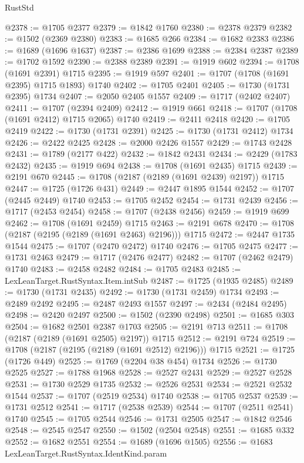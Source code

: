 \begin{lexlean}{RustStd}
\begin{coremodule}
@2378 := @1705 @2377
@2379 := @1842 @1760
@2380 := @2378 @2379
@2382 := @1502 (@2369 @2380)
@2383 := @1685 @266
@2384 := @1682 @2383
@2386 := @1689 (@1696 @1637)
@2387 := @2386 @1699
@2388 := @2384 @2387
@2389 := @1702 @1592
@2390 := @2388 @2389
@2391 := @1919 @602
@2394 := @1708 (@1691 @2391) @1715
@2395 := @1919 @597
@2401 := @1707 (@1708 (@1691 @2395) @1715 @1893) @1740
@2402 := @1705 @2401
@2405 := @1730 (@1731 @2395) @1734
@2407 := @2050 @2405 @1557
@2409 := @1717 (@2402 @2407)
@2411 := @1707 (@2394 @2409)
@2412 := @1919 @661
@2418 := @1707 (@1708 (@1691 @2412) @1715 @2065) @1740
@2419 := @2411 @2418
@2420 := @1705 @2419
@2422 := @1730 (@1731 @2391)
@2425 := @1730 (@1731 @2412) @1734
@2426 := @2422 @2425
@2428 := @2000 @2426 @1557
@2429 := @1743 @2428
@2431 := @1789 (@2177 @422)
@2432 := @1842 @2431
@2434 := @2429 (@1783 @2432)
@2435 := @1919 @694
@2438 := @1708 (@1691 @2435) @1715
@2439 := @2191 @670
@2445 := @1708 (@2187 (@2189 (@1691 @2439) @2197)) @1715
@2447 := @1725 (@1726 @431)
@2449 := @2447 @1895 @1544
@2452 := @1707 (@2445 @2449) @1740
@2453 := @1705 @2452
@2454 := @1731 @2439
@2456 := @1717 (@2453 @2454)
@2458 := @1707 (@2438 @2456)
@2459 := @1919 @699
@2462 := @1708 (@1691 @2459) @1715
@2463 := @2191 @678
@2470 := @1708 (@2187 (@2195 (@2189 (@1691 @2463) @2196))) @1715
@2472 := @2447 @1735 @1544
@2475 := @1707 (@2470 @2472) @1740
@2476 := @1705 @2475
@2477 := @1731 @2463
@2479 := @1717 (@2476 @2477)
@2482 := @1707 (@2462 @2479) @1740
@2483 := @2458 @2482
@2484 := @1705 @2483
@2485 := LexLeanTarget.RustSyntax.Item.intSub
@2487 := @1725 (@1935 @2485)
@2489 := @1730 (@1731 @2435)
@2492 := @1730 (@1731 @2459) @1734
@2493 := @2489 @2492
@2495 := @2487 @2493 @1557
@2497 := @2434 (@2484 @2495)
@2498 := @2420 @2497
@2500 := @1502 (@2390 @2498)
@2501 := @1685 @303
@2504 := @1682 @2501 @2387 @1703
@2505 := @2191 @713
@2511 := @1708 (@2187 (@2189 (@1691 @2505) @2197)) @1715
@2512 := @2191 @724
@2519 := @1708 (@2187 (@2195 (@2189 (@1691 @2512) @2196))) @1715
@2521 := @1725 (@1726 @449)
@2525 := @1769 (@2204 @38 @454) @1734
@2526 := @1730 @2525
@2527 := @1788 @1968
@2528 := @2527 @2431
@2529 := @2527 @2528
@2531 := @1730 @2529 @1735
@2532 := @2526 @2531
@2534 := @2521 @2532 @1544
@2537 := @1707 (@2519 @2534) @1740
@2538 := @1705 @2537
@2539 := @1731 @2512
@2541 := @1717 (@2538 @2539)
@2544 := @1707 (@2511 @2541) @1740
@2545 := @1705 @2544
@2546 := @1731 @2505
@2547 := @1842 @2546
@2548 := @2545 @2547
@2550 := @1502 (@2504 @2548)
@2551 := @1685 @332
@2552 := @1682 @2551
@2554 := @1689 (@1696 @1505)
@2556 := @1683 LexLeanTarget.RustSyntax.IdentKind.param

\end{coremodule}
\end{lexlean}
